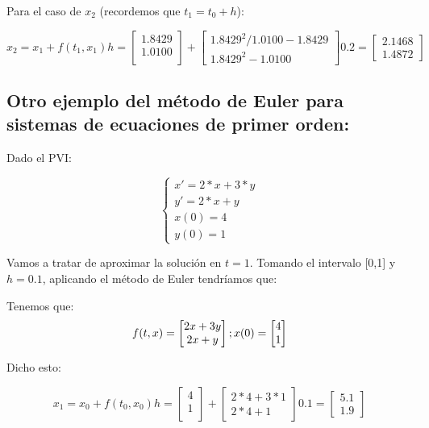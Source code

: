 \documentclass[12pt]{article}       %
\begin{document}
Para el caso de $x_2$ (recordemos que $t_1=t_0+h$):

\begin{equation*}
x_2=x_1+f(t_1,x_1)h=\begin{bmatrix}
1.8429\\
1.0100\\
\end{bmatrix} + \begin{bmatrix}
1.8429^2/1.0100 - 1.8429\\
1.8429^2 - 1.0100
\end{bmatrix}0.2=\begin{bmatrix}
2.1468\\
1.4872
\end{bmatrix}  
\end{equation*}

\subsection{Otro ejemplo del método de Euler para sistemas de ecuaciones de primer orden: }
Dado el PVI:

$$
\begin{cases}
x' = 2*x + 3 * y\\
y' = 2*x + y \\
x(0) = 4\\
y(0)=1
\end{cases}
$$

Vamos a tratar de aproximar la solución en $t=1$. Tomando el intervalo [0,1] y $h=0.1$, aplicando el método de Euler tendríamos que:



Tenemos que: \begin{equation*}
f(t,x)=\begin{bmatrix}
2x+3y \\
2x+y \\
\end{bmatrix};\\
x(0)=\begin{bmatrix}
4 \\
1
\end{bmatrix}
\end{equation*}

Dicho esto:

\begin{equation*}
x_1=x_0+f(t_0,x_0)h=\begin{bmatrix}
4\\
1\\
\end{bmatrix} + \begin{bmatrix}
2*4 +3*1\\
2*4 + 1
\end{bmatrix}0.1=\begin{bmatrix}
5.1\\
1.9
\end{bmatrix}  
\end{equation*}
\end{document}
